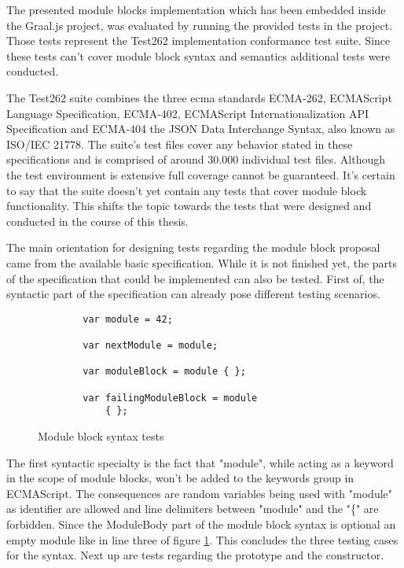 The presented module blocks implementation which has been embedded inside the Graal.js project, was evaluated by running the provided tests in the project. Those tests represent the Test262 implementation conformance test suite. \cite{ecmaTest262} Since these tests can't cover module block syntax and semantics additional tests were conducted.

The Test262 suite combines the three ecma standards ECMA-262, ECMAScript Language Specification, ECMA-402, ECMAScript Internationalization API Specification and ECMA-404 the JSON Data Interchange Syntax, also known as ISO/IEC 21778. The suite's test files cover any  behavior stated in these specifications and is comprised of around 30.000 individual test files. \cite{ecmaTest262, ecmaTestSpec} Although the test environment is extensive full coverage cannot be guaranteed. It's certain to say that the suite doesn't yet contain any tests that cover module block functionality. This shifts the topic towards the tests that were designed and conducted in the course of this thesis.

The main orientation for designing tests regarding the module block proposal came from the available basic specification. While it is not finished yet, the parts of the specification that could be implemented can also be tested. First of, the syntactic part of the specification can already pose different testing scenarios.

\begin{figure}[h!]
    \begin{lstlisting}
        var module = 42;
        
        var nextModule = module;
        
        var moduleBlock = module { };
        
        var failingModuleBlock = module
            { };
    \end{lstlisting}
\caption{Module block syntax tests}
\label{fig:testSyntax}
\end{figure}

The first syntactic specialty is the fact that "module", while acting as a keyword in the scope of module blocks, won't be added to the keywords group in ECMAScript. The consequences are random variables being used with "module" as identifier are allowed and line delimiters between "module" and the "\{" are forbidden. Since the ModuleBody part of the module block syntax  is optional an empty module like in line three of figure \ref{fig:testSyntax}. This concludes the three testing cases for the syntax. Next up are tests regarding the prototype and the constructor.

